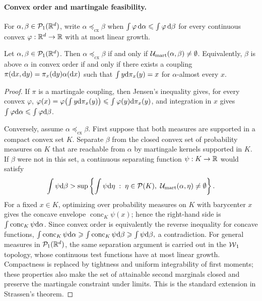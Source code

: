 \paragraph{Convex order and martingale feasibility.}
\begin{defn}\label{def-convex-order}
For $\alpha,\beta\in\mathcal{P}_1(\mathbb{R}^d)$, write $\alpha\preceq_{\mathrm{cx}}\beta$ when
$\int \varphi\,\mathrm{d}\alpha\leqslant\int \varphi\,\mathrm{d}\beta$
for every continuous convex $\varphi:\mathbb{R}^d\to\mathbb{R}$ with at most linear growth.
\end{defn}
\begin{thm}\label{thm-strassen-martingale}
Let $\alpha,\beta\in\mathcal{P}_1(\mathbb{R}^d)$. Then
$\alpha\preceq_{\mathrm{cx}}\beta$ if and only if $\mathcal{U}_{\mathrm{mart}}(\alpha,\beta)\neq\emptyset$.
Equivalently, $\beta$ is above $\alpha$ in convex order if and only if there exists a coupling $\pi(\mathrm{d} x,\mathrm{d} y)=\pi_x(\mathrm{d} y)\alpha(\mathrm{d} x)$ such that $\int y\mathrm{d}\pi_x(y)=x$ for $\alpha$-almost every $x$.
\end{thm}
\begin{proof}
If $\pi$ is a martingale coupling, then Jensen's inequality gives, for every convex $\varphi$,
$\varphi(x) = \varphi\!\left(\int y\mathrm{d}\pi_x(y)\right) \leqslant \int \varphi(y)\mathrm{d}\pi_x(y)$,
and integration in $x$ gives $\int\varphi\mathrm{d}\alpha\leqslant\int\varphi\mathrm{d}\beta$.

Conversely, assume $\alpha\preceq_{\mathrm{cx}}\beta$. First suppose that both measures are supported in a compact convex set $K$. Separate $\beta$ from the closed convex set of probability measures on $K$ that are reachable from $\alpha$ by martingale kernels supported in $K$. If $\beta$ were not in this set, a continuous separating function $\psi:K\to\mathbb{R}$ would satisfy
\[
\int\psi\mathrm{d}\beta
>
\sup
\left\{
\int\psi\mathrm{d}\eta
\;:\;
\eta\in\mathcal{P}(K),\
\mathcal{U}_{\mathrm{mart}}(\alpha,\eta)\neq\emptyset
\right\}.
\]
For a fixed $x\in K$, optimizing over probability measures on $K$ with barycenter $x$ gives the concave envelope $\operatorname{conc}_K\psi(x)$; hence the right-hand side is $\int\operatorname{conc}_K\psi\mathrm{d}\alpha$. Since convex order is equivalently the reverse inequality for concave functions,
\(\int\operatorname{conc}_K\psi\mathrm{d}\alpha \geqslant \int\operatorname{conc}_K\psi\mathrm{d}\beta \geqslant \int\psi\mathrm{d}\beta,\)
a contradiction. For general measures in $\mathcal{P}_1(\mathbb{R}^d)$, the same separation argument is carried out in the $\operatorname{\mathcal{W}}_1$ topology, whose continuous test functions have at most linear growth. Compactness is replaced by tightness and uniform integrability of first moments; these properties also make the set of attainable second marginals closed and preserve the martingale constraint under limits. This is the standard extension in Strassen's theorem.
\end{proof}

